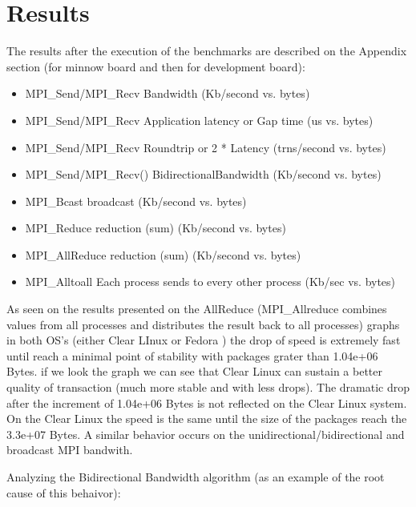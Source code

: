 \documentclass[a4paper]{article}
\begin{document}
\section{Results}

The results after the execution of the benchmarks are described on the Appendix
section (for minnow board and then for development board):

\begin{itemize}

\item MPI\_Send/MPI\_Recv Bandwidth (Kb/second vs. bytes) 
\item MPI\_Send/MPI\_Recv Application latency or Gap time (us vs. bytes) 
\item MPI\_Send/MPI\_Recv Roundtrip or 2 * Latency (trns/second vs. bytes) 
\item MPI\_Send/MPI\_Recv() BidirectionalBandwidth (Kb/second vs. bytes) 
\item MPI\_Bcast broadcast (Kb/second vs. bytes) 
\item MPI\_Reduce reduction (sum) (Kb/second vs. bytes) 
\item MPI\_AllReduce reduction (sum) (Kb/second vs. bytes) 
\item MPI\_Alltoall Each process sends to every other process (Kb/sec vs. bytes) 

\end{itemize}

As seen on the results presented on the AllReduce (MPI\_Allreduce
combines values from all processes and distributes the result back to all
processes) graphs in both OS's (either Clear LInux or Fedora ) the drop of speed 
is extremely fast until reach a minimal point of stability with packages grater 
than 1.04e+06 Bytes. if we look the graph we can see that Clear Linux can sustain
a better quality of transaction (much more stable and with less drops). The 
dramatic drop after the increment of 1.04e+06 Bytes is not reflected on the 
Clear Linux system. On the Clear Linux  the speed is the same until the size of the 
packages reach the 3.3e+07 Bytes. A similar behavior occurs on the
unidirectional/bidirectional and broadcast MPI bandwith. 


Analyzing the  Bidirectional Bandwidth algorithm (as an example of the root
cause of this behaivor): 
\end{document}
